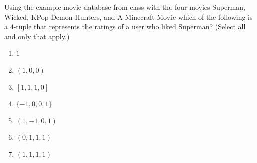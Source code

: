 
Using the example movie database from class with the four movies Superman, Wicked, KPop Demon Hunters, and A Minecraft Movie which of the following is a $4$-tuple that represents the ratings of a user who liked Superman? (Select all and only that apply.)

\begin{enumerate}
\item $1$
\item $(1,0,0)$
\item $[1,1,1,0]$
\item $\{-1, 0, 0, 1\}$
\item $(1,-1,0,1)$
\item $(0,1,1, 1)$
\item $(1,1,1,1)$
\end{enumerate}